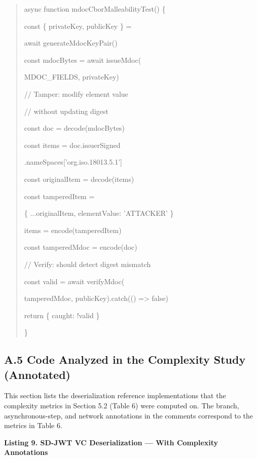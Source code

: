 \documentclass[conference]{IEEEtran}
\begin{document}
\begin{quote}
async function mdocCborMalleabilityTest() \{

const \{ privateKey, publicKey \} =

await generateMdocKeyPair()

const mdocBytes = await issueMdoc(

MDOC\_FIELDS, privateKey)

// Tamper: modify element value

// without updating digest

const doc = decode(mdocBytes)

const items = doc.issuerSigned

.nameSpaces{[}'org.iso.18013.5.1'{]}

const originalItem = decode(items\cite{ref0})

const tamperedItem =

\{ ...originalItem, elementValue: 'ATTACKER' \}

items\cite{ref0} = encode(tamperedItem)

const tamperedMdoc = encode(doc)

// Verify: should detect digest mismatch

const valid = await verifyMdoc(

tamperedMdoc, publicKey).catch(() =\textgreater{} false)

return \{ caught: !valid \}

\}
\end{quote}

\subsection*{A.5 Code Analyzed in the Complexity Study (Annotated)}

This section lists the deserialization reference implementations that the complexity metrics in Section 5.2 (Table 6) were computed on. The branch, asynchronous-step, and network annotations in the comments correspond to the metrics in Table 6.

\textbf{Listing 9. SD-JWT VC Deserialization --- With Complexity Annotations}
\end{document}
